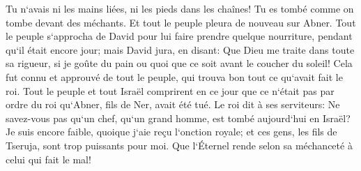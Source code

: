 \verse Tu n`avais ni les mains liées, ni les pieds dans les chaînes! Tu es tombé comme on tombe devant des méchants. 
\verse Et tout le peuple pleura de nouveau sur Abner. Tout le peuple s`approcha de David pour lui faire prendre quelque nourriture, pendant qu`il était encore jour; mais David jura, en disant: Que Dieu me traite dans toute sa rigueur, si je goûte du pain ou quoi que ce soit avant le coucher du soleil! 
\verse Cela fut connu et approuvé de tout le peuple, qui trouva bon tout ce qu`avait fait le roi. 
\verse Tout le peuple et tout Israël comprirent en ce jour que ce n`était pas par ordre du roi qu`Abner, fils de Ner, avait été tué. 
\verse Le roi dit à ses serviteurs: Ne savez-vous pas qu`un chef, qu`un grand homme, est tombé aujourd`hui en Israël? 
\verse Je suis encore faible, quoique j`aie reçu l`onction royale; et ces gens, les fils de Tseruja, sont trop puissants pour moi. Que l`Éternel rende selon sa méchanceté à celui qui fait le mal! 

